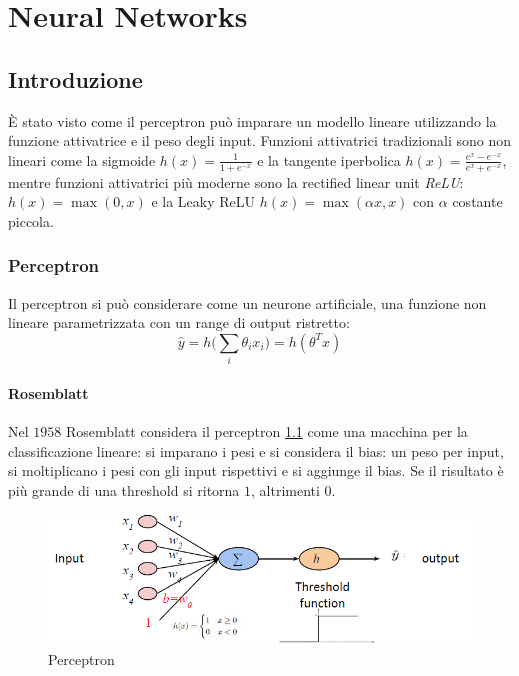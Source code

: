 \chapter{Neural Networks}

\section{Introduzione}
\`E stato visto come il perceptron pu\`o imparare un modello lineare utilizzando la funzione attivatrice e il peso degli input.
Funzioni attivatrici tradizionali sono non lineari come la sigmoide $h(x) = \frac{1}{1+e^{-x}}$ e la tangente iperbolica $h(x) = \frac{e^x-e^{-x}}{e^x+e^{-x}}$, mentre funzioni attivatrici pi\`u moderne sono la rectified linear unit \emph{ReLU}: $h(x) = \max(0,x)$ e la Leaky ReLU $h(x) = \max(\alpha x,x)$ con $\alpha$ costante piccola.

	\subsection{Perceptron}
	Il perceptron si pu\`o considerare come un neurone artificiale, una funzione non lineare parametrizzata con un range di output ristretto:
	$$\hat{y} = h\bigl(\sum\limits_i\theta_ix_i\bigr) = h(\theta^Tx)$$

		\subsubsection{Rosemblatt}
		Nel $1958$ Rosemblatt considera il perceptron \ref{fig:chapter11-00} come una macchina per la classificazione lineare: si imparano i pesi e si considera il bias: un peso per input, si moltiplicano i pesi con gli input rispettivi e si aggiunge il bias.
		Se il risultato \`e pi\`u grande di una threshold si ritorna $1$, altrimenti $0$.
	
	\begin{figure}
		\centering
		\includegraphics[width=0.6\linewidth]{imgs/chapter11/img0}
		\caption{Perceptron}
		\label{fig:chapter11-00}
	\end{figure}

